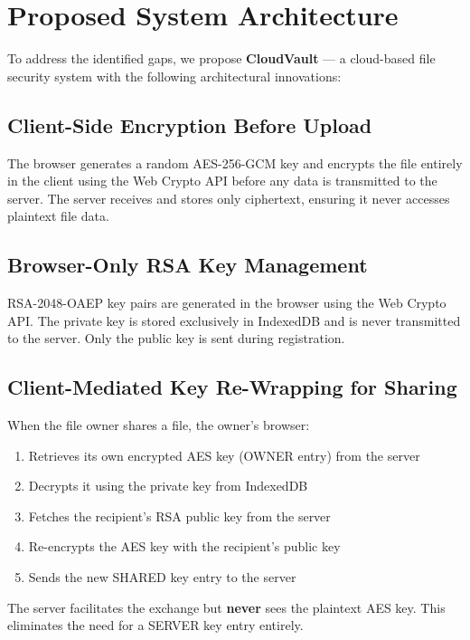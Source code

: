 \documentclass[conference]{IEEEtran}
\begin{document}
\section{Proposed System Architecture}

To address the identified gaps, we propose \textbf{CloudVault} --- a cloud-based file security system with the following architectural innovations:

\subsection{Client-Side Encryption Before Upload}

The browser generates a random AES-256-GCM key and encrypts the file entirely in the client using the Web Crypto API before any data is transmitted to the server. The server receives and stores only ciphertext, ensuring it never accesses plaintext file data.

\subsection{Browser-Only RSA Key Management}

RSA-2048-OAEP key pairs are generated in the browser using the Web Crypto API. The private key is stored exclusively in IndexedDB and is never transmitted to the server. Only the public key is sent during registration.

\subsection{Client-Mediated Key Re-Wrapping for Sharing}

When the file owner shares a file, the owner's browser:
\begin{enumerate}
    \item Retrieves its own encrypted AES key (OWNER entry) from the server
    \item Decrypts it using the private key from IndexedDB
    \item Fetches the recipient's RSA public key from the server
    \item Re-encrypts the AES key with the recipient's public key
    \item Sends the new SHARED key entry to the server
\end{enumerate}

The server facilitates the exchange but \textbf{never} sees the plaintext AES key. This eliminates the need for a SERVER key entry entirely.
\end{document}
